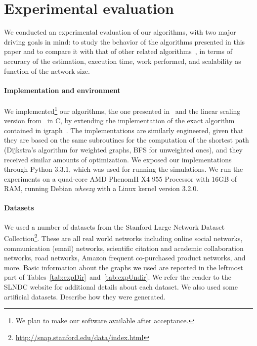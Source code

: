 \section{Experimental evaluation}\label{sec:exper}
We conducted an experimental evaluation of our algorithms, with two major
driving goals in mind: to study the behavior of the algorithms presented in this
paper and to compare it with that of other related
algorithms~\citep{Brandes01,BrandesP07,JacobKLPT05,GeisbergerSS08}, in terms of
accuracy of the estimation, execution time, work performed, and scalability as
function of the network size. 


\paragraph{Implementation and environment}
We implemented\footnote{We plan to make our software available after
acceptance.} our algorithms, the one presented in~\citep{BrandesP07,JacobKLPT05}
and the linear scaling version from~\citep{GeisbergerSS08} in C, by extending
the implementation of the exact algorithm~\citep{Brandes01} contained in
igraph~\citep{igraph}. The implementations are similarly engineered, given that
they are based on the same subroutines for the computation of the shortest path
(Dijkstra's algorithm for weighted graphs, BFS for unweighted ones), and they
received similar amounts of optimization. We exposed our implementations through
Python 3.3.1, which was used for running the simulations. We run the experiments
on a quad-core AMD Phenom\texttrademark II X4 955 Processor with 16GB of RAM,
running Debian \emph{wheezy} with a Linux kernel version 3.2.0.

\paragraph{Datasets} We used a number of datasets from the Stanford Large
Network Dataset
Collection\footnote{\url{http://snap.stanford.edu/data/index.html}}. These are
all real world networks including online social networks, communication (email)
networks, scientific citation and academic collaboration networks, road
networks, Amazon frequent co-purchased product networks, and more. Basic
information about the graphs we used are reported in the leftmost part of
Tables~\ref{tab:expDir}~and~\ref{tab:expUndir}. We refer the
reader to the SLNDC website for additional details about each dataset. \XXX We
also used some artificial datasets. Describe how they were generated.

